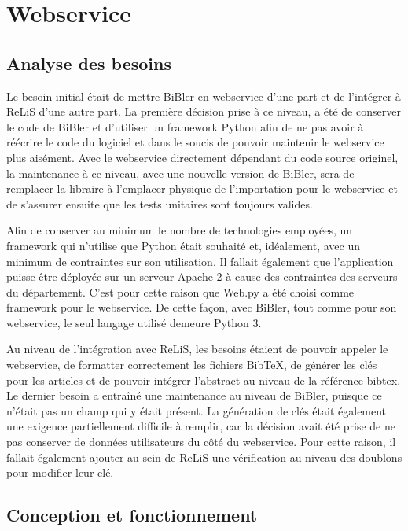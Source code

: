 \documentclass[a4paper,12pt,titlepage]{article}
\let\oldsection\section
\renewcommand\section{\clearpage\oldsection}
\begin{document}
\section{Webservice}
\subsection{Analyse des besoins}
Le besoin initial était de mettre BiBler en webservice d'une part et de l'intégrer à ReLiS d'une autre part. La première décision prise à ce niveau, a été de conserver le code de BiBler et d'utiliser un framework Python afin de ne pas avoir à réécrire le code du logiciel et dans le soucis de pouvoir maintenir le webservice plus aisément. Avec le webservice directement dépendant du code source originel, la maintenance à ce niveau, avec une nouvelle version de BiBler, sera de remplacer la libraire à l'emplacer physique de l'importation pour le webservice et de s'assurer ensuite que les tests unitaires sont toujours valides. \newline

Afin de conserver au minimum le nombre de technologies employées, un framework qui n'utilise que Python était souhaité et, idéalement, avec un minimum de contraintes sur son utilisation. Il fallait également que l'application puisse être déployée sur un serveur Apache 2 à cause des contraintes des serveurs du département. C'est pour cette raison que Web.py \cite{Webpy1} a été choisi comme framework pour le webservice. De cette façon, avec BiBler, tout comme pour son webservice, le seul langage utilisé demeure Python 3.

Au niveau de l'intégration avec ReLiS, les besoins étaient de pouvoir appeler le webservice, de formatter correctement les fichiers BibTeX, de générer les clés pour les articles et de pouvoir intégrer l'abstract au niveau de la référence bibtex. Le dernier besoin a entraîné une maintenance au niveau de BiBler, puisque ce n'était pas un champ qui y était présent. La génération de clés était également une exigence partiellement difficile à remplir, car la décision avait été prise de ne pas conserver de données utilisateurs du côté du webservice. Pour cette raison, il fallait également ajouter au sein de ReLiS une vérification au niveau des doublons pour modifier leur clé. \newline


\subsection{Conception et fonctionnement}
\end{document}
